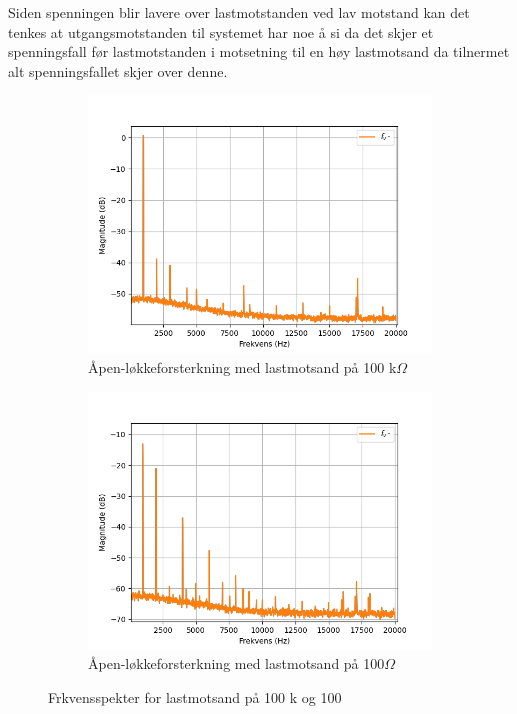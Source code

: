     Siden spenningen blir lavere over lastmotstanden  ved lav motstand kan det tenkes at utgangsmotstanden  til systemet har noe å si da det skjer et spenningsfall før lastmotstanden i motsetning til en høy lastmotsand da tilnermet alt spenningsfallet skjer over denne.

    \begin{figure}[H]
        \centering
        \begin{subfigure}{.5\textwidth}
            \centering
            \includegraphics[width=1\linewidth]{./Images/03Research/spektrum100k.png}
            \caption{Åpen-løkkeforsterkning med lastmotsand på 100 k$\Omega$}
            \label{fig:100kspek}
        \end{subfigure}%
        \begin{subfigure}{.5\textwidth}
            \centering
            \includegraphics[width=1\linewidth]{./Images/03Research/spektrum100.png}
            \caption{Åpen-løkkeforsterkning med lastmotsand på 100$\Omega$}
            \label{fig:100spekk}
        \end{subfigure}
        \caption{Frkvensspekter for lastmotsand på 100 k\text{$\Omega$} og 100 \text{$\Omega$}}
        \label{fig:Frkvensspekter}
    \end{figure}


